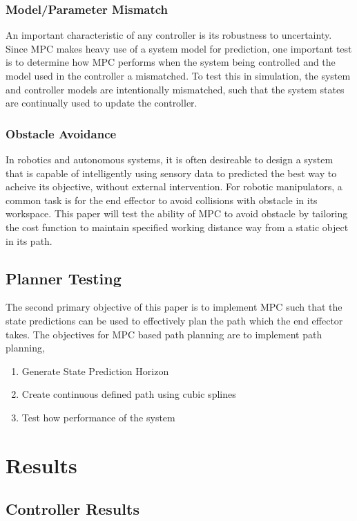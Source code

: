 \documentclass[journal]{IEEEtran}
\begin{document}
\subsubsection{Model/Parameter Mismatch}
An important characteristic of any controller is its robustness to uncertainty. Since MPC makes heavy use of a system model for prediction, one important test is to determine how MPC performs when the system being controlled and the model used in the controller a mismatched. To test this in simulation, the system and controller models are intentionally mismatched, such that the system states are continually used to update the controller.\\

\subsubsection{Obstacle Avoidance}
In robotics and autonomous systems, it is often desireable to design a system that is capable of intelligently using sensory data to predicted the best way to acheive its objective, without external intervention. For robotic manipulators, a common task is for the end effector to avoid collisions with obstacle in its workspace. This paper will test the ability of MPC to avoid obstacle by tailoring the cost function to maintain specified working distance way from a static object in its path.

\subsection{Planner Testing}

The second primary objective of this paper is to implement MPC such that the state predictions can be used to effectively plan the path which the end effector takes. The objectives for MPC based path planning are to implement path planning,


\begin{enumerate}
    \item Generate State Prediction Horizon
    \item Create continuous defined path using cubic splines
    \item Test how performance of the system
\end{enumerate}


\section{Results}
\subsection{Controller Results}
\end{document}
